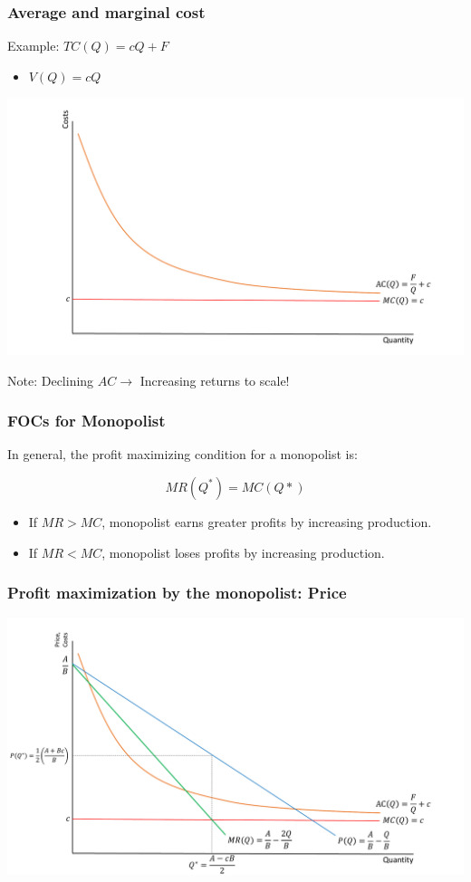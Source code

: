 \documentclass{beamer}
\begin{document}
\begin{frame}
\frametitle{Average and marginal cost}
Example: $TC(Q)=cQ+F$
	\begin{itemize}
		\item$ V(Q) =cQ$
	\end{itemize}
		\includegraphics[scale=0.30]{SL2_2.pdf}

Note: Declining $AC\rightarrow$ Increasing returns to scale!

\end{frame}

\begin{frame}
	\frametitle{FOCs for Monopolist}

\noindent In general, the profit maximizing condition for a monopolist is:

\begin{equation}
MR(Q^*)=MC(Q*) \nonumber
\end{equation}

\begin{itemize}
	\item If $MR>MC$, monopolist earns greater profits by increasing production.
	\item If $MR<MC$, monopolist loses profits by increasing production.
\end{itemize}

\end{frame}

\begin{frame}
\frametitle{Profit maximization by the monopolist: Price}

\includegraphics[scale=0.30]{SL2_3.pdf}
\end{frame}
\end{document}
